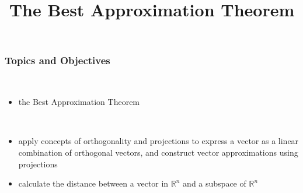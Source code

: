 \title{The Best Approximation Theorem}
\subtitle{\SubTitleName}
\institute[]{\Course}
\author{\Instructor}
\maketitle   
  
\begin{frame}\frametitle{Topics and Objectives}
 \\
\begin{itemize}
    \item the Best Approximation Theorem
\end{itemize}

\vspace{0.5cm}

\\


\begin{itemize}
    \item apply concepts of orthogonality and projections to express a vector as a linear combination of orthogonal vectors,
        and construct vector approximations using projections
        \item calculate the distance between a vector in $\mathbb R^n$ and a subspace of $\mathbb R^n$
    \end{itemize}

    \vspace{0.25cm} 
\end{frame}


